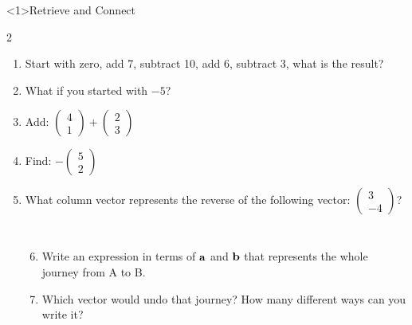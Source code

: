 \documentclass{beamer}
\newcommand{\ashow}[1]{\uncover<2->{\textcolor{red}{\small #1}}}
\begin{document}
\begin{frame}<1>{Retrieve and Connect}

\begin{multicols}{2}
\begin{enumerate}
  \item Start with zero, add 7, subtract 10, add 6, subtract 3, what is the result? \ashow{0}
  \item What if you started with $-5$? \ashow{$-5$}
  \item Add:
  $\begin{pmatrix}4\\1\end{pmatrix}
  +
  \begin{pmatrix}2\\3\end{pmatrix}$ \ashow{\(\binom{6}{4}\)}
  \item Find:
  $-\begin{pmatrix}5\\2\end{pmatrix}$ \ashow{\(\binom{-5}{-2}\)}
  \item What column vector represents the reverse of the following vector:
  $\begin{pmatrix}3\\-4\end{pmatrix}$? \ashow{\(\binom{-3}{4}\)}
\end{enumerate}
\end{multicols}

\vspace{0.3cm}



\begin{columns}[T]

\begin{center}
\end{center}


\begin{enumerate}
    \setcounter{enumi}{5}
  \item Write an expression in terms of $\bf{a}$ and $\bf{b}$ that represents the whole journey from A to B. \ashow{\(\mathbf{a}+\mathbf{b}\)}
  \item Which vector would undo that journey? How many different ways can you write it? \ashow{\(\overrightarrow{BA} = -(\mathbf{a}+\mathbf{b}) = -\mathbf{a}-\mathbf{b}\)}
\end{enumerate}

\end{columns}

\end{frame}
\end{document}
